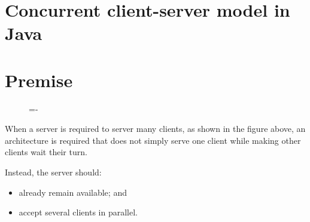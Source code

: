 \documentclass[a4paper]{systems-software}
\begin{document}
\section{Concurrent client-server model in Java}

\section*{Premise}

\begin{figure}[H]
	\lineskip=-\fboxrule
\end{figure}

When a server is required to server many clients, as shown in the figure above, an architecture is required that does not simply serve one client while making other clients wait their turn.

Instead, the server should:
\begin{itemize}
	\item already remain available; and
	\item accept several clients in parallel.
\end{itemize}
\end{document}
